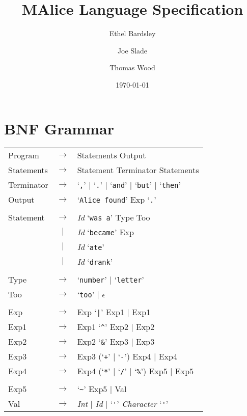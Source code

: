 \documentclass[a4wide, 11pt]{article}
\begin{document}
\title{MAlice Language Specification}

\author{Ethel Bardsley \and Joe Slade \and Thomas Wood}

\date{\today}         %

\maketitle            %

\section{BNF Grammar} 
\begin{tabular}{lcl}
Program     & $\to$ & Statements Output \\
Statements  & $\to$ & Statement Terminator Statements \\
Terminator  & $\to$ & `\verb:,:' $|$ `\verb:.:' $|$ `\verb:and:' $|$ `\verb:but:' $|$ `\verb:then:' \\
Output      & $\to$ & `\verb:Alice found:' Exp `\verb:.:' \\
\\
Statement   & $\to$ & \emph{Id} `\verb|was a|' Type Too \\
            &  $|$  & \emph{Id} `\verb|became|' Exp \\
            &  $|$  & \emph{Id} `\verb|ate|' \\
            &  $|$  & \emph{Id} `\verb|drank|' \\
\\
Type        & $\to$ & `\verb|number|' $|$ `\verb|letter|' \\
Too         & $\to$ & `\verb|too|' $|$ $\epsilon$ \\
\\
Exp         & $\to$ & Exp `\verb:|:' Exp1 $|$ Exp1 \\
Exp1        & $\to$ & Exp1 `\verb:^:' Exp2 $|$ Exp2 \\
Exp2        & $\to$ & Exp2 `\verb:&:' Exp3 $|$ Exp3 \\
Exp3        & $\to$ & Exp3 (`\verb:+:' $|$ `\verb:-:') Exp4 $|$ Exp4 \\
Exp4        & $\to$ & Exp4 (`\verb:*:' $|$ `\verb:/:' $|$ `\verb:%:') Exp5 $|$ Exp5 \\
\\
Exp5        & $\to$ & `\verb:~:' Exp5 $|$ Val \\
Val         & $\to$ & \emph{Int} $|$ \emph{Id} $|$ `\verb|'|' \emph{Character} `\verb|'|'
\end{tabular}
\end{document}
